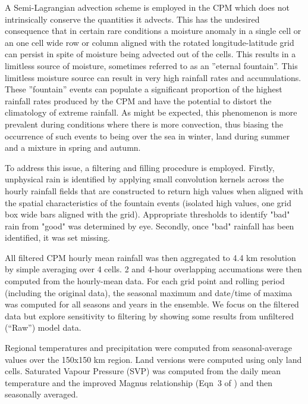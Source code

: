 \documentclass[11pt,a4paper]{article}
\begin{document}
A Semi-Lagrangian advection scheme is employed in the CPM which does not intrinsically conserve the quantities it advects. This has the undesired consequence that in certain rare conditions a moisture anomaly in a single cell or  an one cell wide row or column aligned with the rotated longitude-latitude grid can persist in spite of moisture being advected out of the cells. This results in a limitless source of moisture, sometimes referred to as an ''eternal fountain''.  This limitless moisture source can result in very high rainfall rates and accumulations.  These ''fountain'' events can populate a significant proportion of the highest rainfall rates produced by the CPM and have the potential to distort the climatology of extreme rainfall.  As might be expected, this phenomenon is more prevalent during conditions where there is more convection, thus biasing the occurrence of such events to being over the sea in winter, land during summer and a mixture in spring and autumn.

To address this issue, a filtering and filling procedure is employed.  Firstly, unphysical rain is identified by applying small convolution kernels across the hourly rainfall fields that are constructed to return high values when aligned with the spatial characteristics of the fountain events (isolated high values, one grid box wide bars aligned with the grid).  Appropriate thresholds to identify "bad" rain from "good" was determined by eye.  Secondly, once "bad" rainfall has been identified, it was set missing. 

All filtered CPM hourly mean rainfall was then aggregated to 4.4 km resolution by simple averaging over 4 cells.  2 and 4-hour   overlapping accumations were then computed from the hourly-mean data. For each grid point and rolling period (including the original data),  the seasonal  maximum and date/time of maxima was computed for all seasons and years in the ensemble. We focus on the filtered data but  explore sensitivity to filtering by showing some results from unfiltered (``Raw'') model data.

Regional temperatures and precipitation were computed from seasonal-average values over the 150x150 km region. Land versions were computed using only land cells. Saturated Vapour Pressure (SVP) was computed from the daily mean temperature and the improved Magnus relationship (Eqn~3 of \cite{Huang2018SVP}) and then seasonally averaged.
\end{document}
